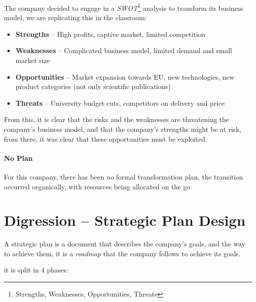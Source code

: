 \documentclass[openright, twoside, twocolumn]{report}
\begin{document}
The company decided to engage in a \emph{SWOT}\footnote{
  Strengths, Weaknesses, Opportunities, Threats
} analysis to transform its business model, we are replicating this in the classroom:

\begin{itemize}
  \item \textbf{Strengths} --  High profits, captive market, limited competition
  \item \textbf{Weaknesses} -- Complicated business model, limited demand and small market size
  \item \textbf{Opportunities} -- Market expansion towards EU, new technologies, new product categories (not only scientific publications)
  \item \textbf{Threats} -- University budget cuts, competitors on delivery and price
\end{itemize}

From this, it is clear that the risks and the weaknesses are threatening the company's business model, and that the company's strengths might
be at risk, from there, it was clear that these opportunities must be exploited.

\paragraph{No Plan}

For this company, there has been \emph{no} formal transformation plan, the transition occurred organically, with resources being
allocated on the go

\section{Digression -- Strategic Plan Design}

A strategic plan is a document that describes the company's goals, and the way to achieve them, it is a \emph{roadmap} that
the company follows to achieve its goals.

it is split in 4 phases:
\end{document}

